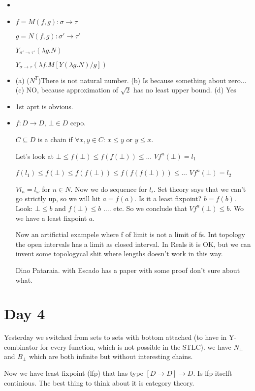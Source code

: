 \documentclass[a4paper,10pt]{book}
\newcommand{\rarr}{ \rightarrow }
\begin{document}
\begin{itemize}
 \item 
 \item $f = M (f, g) : \sigma \rarr \tau$
 
 $g = N(f,g) : \sigma' \rarr \tau'$
 
 $Y_{\sigma' \rarr \tau'} (\lambda g . N)$
 
 $Y_{\sigma \rarr \tau} (\lambda f . M[Y(\lambda g . N) / g])$
 \item (a) ($N^T$)There is not natural number.
   (b) Is because something about zero...
   (c) NO, because approximation of $\sqrt{2}$ has no least upper bound.
   (d) Yes
 \item 1st aprt is obvious.
 \item $f:D \rarr D$, $\bot \in D$ ccpo.
 
 $C \subseteq  D$ is a chain  if $\forall x,y \in C$: $x \leq y$ or $y\leq x$.
 
 Let's look at $\bot \leq f(\bot) \leq f(f(\bot)) \leq ...$ $Vf^n(\bot) = l_1$

 $f(l_1) \leq f(\bot) \leq f(f(\bot)) \leq f(f(f(\bot))) \leq ...$ $Vf^n(\bot) = l_2$
 
 $V l_n = l_\omega$ for $n\in N$. Now we do  sequence for $l_i$. 
 Set theory says that we can't go strictly up,  so we will hit $a=f(a)$. Is it a least fixpoint?
 $b=f(b)$. Look: $\bot \leq b$ and $f(\bot) \leq b$ .... etc. So we conclude that 
 $V f^n(\bot) \leq b$. Wo we have a least fixpoint $a$.
 
 Now an artifictial exampele where f of limit is not a limit of fs. Int topology the 
 open intervals has a limit as closed interval. In Reals it is OK, but we can invent some topologycal
 shit where lengths doesn't work in this way.
 
 Dino Pataraia. with Escado has a paper with some proof don't sure about what.
 
 \end{itemize}

 
\section{Day 4} 
Yesterday we switched from sets to sets with bottom attached (to have in Y-combinator 
for every function, which is not possible in the STLC).
we have $N_\bot$ and $B_\bot$ which are both infinite but without interesting chains.

Now we have least fixpoint (lfp) that has type $[D\rarr D] \rarr D$. Is lfp itselft continious.
The best thing to think about it is category theory.
\end{document}
